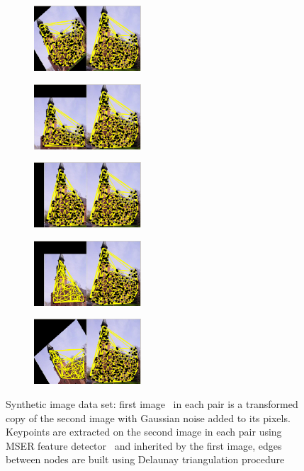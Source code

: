 \begin{figure}[h] 
		\begin{subfigure}[b]{0.3\textwidth}
			\centering
			\includegraphics[width=4cm]{"chapter3/fig/ImageTrafo/Img_pair1"} 
			\caption{}\label{fig:ImageTrafo_initGraphs_a}
		\end{subfigure}
		\begin{subfigure}[b]{0.3\textwidth}
			\centering
			\includegraphics[width=4cm]{"chapter3/fig/ImageTrafo/Img_pair2"} 
			\caption{}
		\end{subfigure} 
		\begin{subfigure}[b]{0.3\textwidth}
			\centering
			\includegraphics[width=4cm]{"chapter3/fig/ImageTrafo/Img_pair3"}
			\caption{}
		\end{subfigure} 	
		\begin{subfigure}[b]{0.5\textwidth}
			\centering
			\includegraphics[width=4cm]{"chapter3/fig/ImageTrafo/Img_pair4"} 
			\caption{}
		\end{subfigure} 
		\begin{subfigure}[b]{0.5\textwidth}
			\centering
			\includegraphics[width=4cm]{"chapter3/fig/ImageTrafo/Img_pair5"}
			\caption{}
		\end{subfigure} 	
	\caption[Synthetic image data set]{Synthetic image data set: first image~\cite{SUN} in each pair is a transformed copy of the second image with Gaussian noise added to its pixels. Keypoints are extracted on the second image in each pair using MSER feature detector~\cite{MSER} and inherited by the first image, edges between nodes are built using Delaunay triangulation procedure~\cite{Hancock_EM_SVD,Hancock_GM_SpectralPart}}
	\label{fig:ImageTrafo_initGraphs}
\end{figure}

